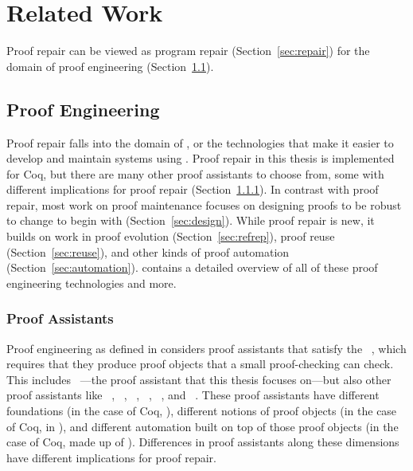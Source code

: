 \chapter{Related Work}
\label{sec:related}


Proof repair can be viewed as program repair (Section~\ref{sec:repair})
for the domain of proof engineering (Section~\ref{sec:proofeng}).

\section{Proof Engineering}
\label{sec:proofeng}

Proof repair falls into the domain of ,
or the technologies that make it easier to develop and maintain
systems  using .
Proof repair in this thesis is implemented for Coq, but there are
many other proof assistants to choose from, some with different implications
for proof repair (Section~\ref{sec:ass}).
In contrast with proof repair,
most work on proof maintenance focuses on
designing proofs to be robust to change to begin with (Section~\ref{sec:design}).
While proof repair is new, it builds on work in proof evolution (Section~\ref{sec:refrep}),
proof reuse (Section~\ref{sec:reuse}),
and other kinds of proof automation (Section~\ref{sec:automation}).
 contains a detailed overview of all of these proof engineering technologies and more.

\subsection{Proof Assistants}
\label{sec:ass}

Proof engineering as defined in  considers proof assistants that satisfy the ~\cite{Barendregt2002,Barendregt2351}, which requires that they produce proof objects that a small proof-checking  can check.
This includes ~\cite{coq}---the proof assistant that this thesis focuses on---but also other proof assistants like
~\cite{isabelle}, ~\cite{hollight}, ~\cite{hol4-interact}, ~\cite{agda}, ~\cite{lean}, and ~\cite{nuprl}.
These proof assistants have different foundations (in the case of Coq, ),
different notions of proof objects (in the case of Coq,  in ),
and different automation built on top of those proof objects (in the case of Coq,  made up of  ).
Differences in proof assistants along these dimensions have different implications for proof repair.

